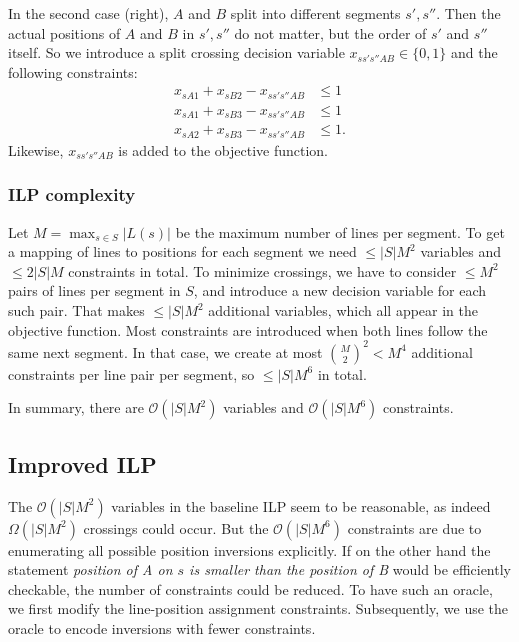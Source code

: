 \documentclass{llncs}
\begin{document}
In the second case (right), $A$ and $B$ split into different segments $s', s''$. Then the actual positions of $A$ and $B$ in $s', s''$ do not matter, but the order of $s'$ and $s''$ itself. So we introduce a split crossing decision variable $x_{ss's''AB} \in \{0,1\}$ and the following constraints:
\begin{align*}
	x_{sA1} + x_{sB2} - x_{ss's''AB} &\leq 1 \\
	x_{sA1} + x_{sB3} - x_{ss's''AB} &\leq 1 \\
	x_{sA2} + x_{sB3} - x_{ss's''AB} &\leq 1.
\end{align*}
Likewise, $x_{ss's''AB}$ is added to the objective function.

\subsubsection{ILP complexity}
Let $M = \max_{s \in S} |L(s)|$ be the maximum number of lines per segment. To get a mapping of lines to positions for each segment we need $\leq |S|M^{2}$ variables and $\leq 2|S|M$ constraints in total. To minimize crossings, we have to consider $\leq M^{2}$ pairs of lines per segment in $S$, and introduce a new decision variable for each such pair. That makes $\leq |S| M^{2}$ additional variables, which all appear in the objective function. Most constraints are introduced when both lines follow the same next segment. In that case, we create at most $\binom{M}{2}^{2} < M^{4}$ additional constraints per line pair per segment, so $\leq |S| M^{6}$ in total.

In summary, there are $\mathcal{O}(|S|M^{2})$ variables and $\mathcal{O}(|S|M^{6})$ constraints.

%
\subsection{Improved ILP}\label{SEC:improved}
%
The $\mathcal{O}(|S|M^{2})$ variables in the baseline ILP seem to be reasonable, as indeed $\Omega(|S|M^{2})$ crossings could occur. But the $\mathcal{O}(|S|M^{6})$ constraints are due to enumerating all possible position inversions explicitly. If on the other hand the statement \emph{position of A on $s$ is smaller than the position of B} would be efficiently checkable, the number of constraints could be reduced. To have such an oracle, we first modify the line-position assignment constraints. Subsequently, we use  the oracle to encode inversions with fewer constraints.
\end{document}
